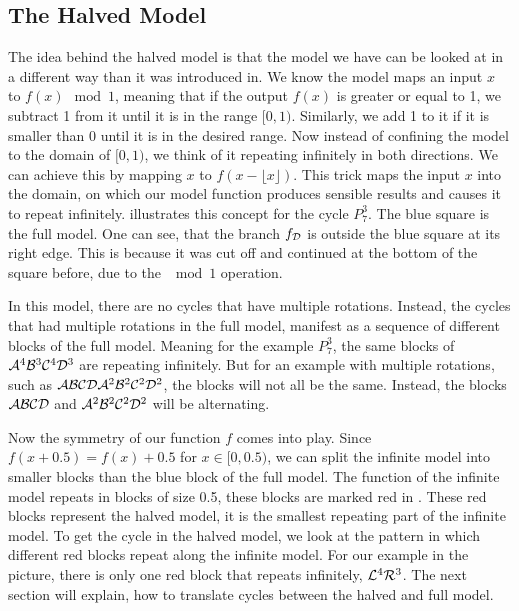\subsection{The Halved Model}

The idea behind the halved model is that the model we have can be looked at in a different way than it was introduced in.
We know the model maps an input $x$ to $f(x) \mod 1$, meaning that if the output $f(x)$ is greater or equal to 1, we subtract 1 from it until it is in the range $[0, 1)$.
Similarly, we add 1 to it if it is smaller than 0 until it is in the desired range.
Now instead of confining the model to the domain of $[0, 1)$, we think of it repeating infinitely in both directions.
We can achieve this by mapping $x$ to $f(x - \lfloor x \rfloor)$.
This trick maps the input $x$ into the domain, on which our model function produces sensible results and causes it to repeat infinitely.
 illustrates this concept for the cycle $P_7^3$.
The blue square is the full model.
One can see, that the branch $f_{\mathcal{D}}$ is outside the blue square at its right edge.
This is because it was cut off and continued at the bottom of the square before, due to the $\mod 1$ operation.


In this model, there are no cycles that have multiple rotations.
Instead, the cycles that had multiple rotations in the full model, manifest as a sequence of different blocks of the full model.
Meaning for the example $P_7^3$, the same blocks of $\mathcal{A}^4\mathcal{B}^3\mathcal{C}^4\mathcal{D}^3$ are repeating infinitely.
But for an example with multiple rotations, such as $\mathcal{A}\mathcal{B}\mathcal{C}\mathcal{D}\mathcal{A}^2\mathcal{B}^2\mathcal{C}^2\mathcal{D}^2$, the blocks will not all be the same.
Instead, the blocks $\mathcal{A}\mathcal{B}\mathcal{C}\mathcal{D}$ and $\mathcal{A}^2\mathcal{B}^2\mathcal{C}^2\mathcal{D}^2$ will be alternating.

Now the symmetry of our function $f$ comes into play.
Since $f(x + 0.5) = f(x) + 0.5$ for $x \in [0, 0.5)$, we can split the infinite model into smaller blocks than the blue block of the full model.
The function of the infinite model repeats in blocks of size 0.5, these blocks are marked red in .
These red blocks represent the halved model, it is the smallest repeating part of the infinite model.
To get the cycle in the halved model, we look at the pattern in which different red blocks repeat along the infinite model.
For our example in the picture, there is only one red block that repeats infinitely, $\mathcal{L}^4\mathcal{R}^3$.
The next section will explain, how to translate cycles between the halved and full model.

